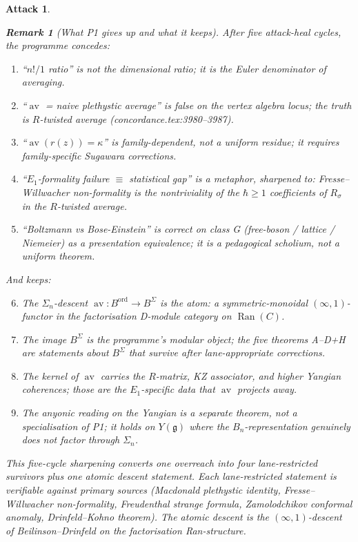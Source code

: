 \documentclass[11pt]{article}
\newtheorem*{attack}{Attack}
\theoremstyle{definition}
\newtheorem{remark}[theorem]{Remark}
\DeclareMathOperator{\Ran}{Ran}
\DeclareMathOperator{\av}{av}
\newcommand{\ord}{\mathrm{ord}}
\begin{document}
\begin{attack}
\begin{remark}[What P1 gives up and what it keeps]\label{rem:p1-concessions}
After five attack-heal cycles, the programme concedes:
\begin{enumerate}[leftmargin=1.4em]
\item ``$n!/1$ ratio'' is not the dimensional ratio; it is the Euler
denominator of averaging.
\item ``$\av$ = naive plethystic average'' is false on the vertex
algebra locus; the truth is $R$-twisted average
(concordance.tex:3980--3987).
\item ``$\av(r(z)) = \kappa$'' is family-dependent, not a uniform
residue; it requires family-specific Sugawara corrections.
\item ``$E_1$-formality failure $\equiv$ statistical gap'' is a metaphor,
sharpened to: Fresse--Willwacher non-formality is the nontriviality
of the $\hbar \ge 1$ coefficients of $R_\sigma$ in the $R$-twisted
average.
\item ``Boltzmann vs Bose-Einstein'' is correct on class G
(free-boson / lattice / Niemeier) as a presentation equivalence;
it is a pedagogical scholium, not a uniform theorem.
\end{enumerate}
And keeps:
\begin{enumerate}[leftmargin=1.4em]
\setcounter{enumi}{5}
\item The $\Sigma_n$-descent $\av: B^{\ord} \to B^{\Sigma}$ is the
atom: a symmetric-monoidal $(\infty, 1)$-functor in the factorisation
D-module category on $\Ran(C)$.
\item The image $B^{\Sigma}$ is the programme's modular object; the
five theorems A--D+H are statements about $B^{\Sigma}$ that survive
after lane-appropriate corrections.
\item The kernel of $\av$ carries the $R$-matrix, KZ associator, and
higher Yangian coherences; those are the $E_1$-specific data that
$\av$ projects away.
\item The anyonic reading on the Yangian is a separate theorem, not a
specialisation of P1; it holds on $Y(\mathfrak g)$ where the
$B_n$-representation genuinely does not factor through $\Sigma_n$.
\end{enumerate}
This five-cycle sharpening converts one overreach into four
lane-restricted survivors plus one atomic descent statement. Each
lane-restricted statement is verifiable against primary sources
(Macdonald plethystic identity, Fresse--Willwacher non-formality,
Freudenthal strange formula, Zamolodchikov conformal anomaly,
Drinfeld--Kohno theorem). The atomic descent is the
$(\infty,1)$-descent of Beilinson--Drinfeld on the factorisation
Ran-structure.
\end{remark}


\end{attack}
\end{document}
